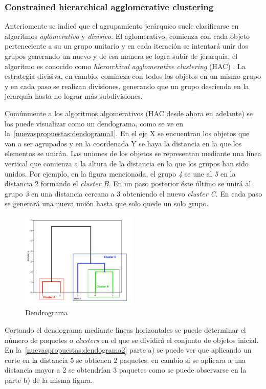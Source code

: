 \subsubsection{Constrained hierarchical agglomerative clustering}
Anteriomente se indicó que el agrupamiento jerárquico suele clasificarse en algoritmos \textit{aglomerativo} y \textit{divisivo}. El aglomerativo, comienza con cada objeto perteneciente a su un grupo unitario y en cada iteración se intentará unir dos grupos generando un nuevo y de esa manera se logra subir de jerarquía, el algoritmo es conocido como \textit{hierarchical agglomerative clustering} (HAC) \cite{journals/tkde/Amer-YahiaBCFMZ14}. La estrategia divisiva, en cambio, comineza con todos los objetos en un mismo grupo y en cada paso se realizan divisiones, generando que un grupo descienda en la jerarquía hasta no lograr más subdivisiones.

Comúnmente a los algoritmos algomerativos (HAC desde ahora en adelante) se los puede visualizar como un dendograma, como se ve en la~\autoref{nuevaspropuestas:dendograma1}. En el eje X se encuentran los objetos que van a ser agrupados y en la coordenada Y se haya la distancia en la que los elementos se unirán. Las uniones de los objetos se representan mediante una línea vertical que comienza a la altura de la distancia en la que los grupos han sido unidos. Por ejemplo, en la figura mencionada, el grupo \textit{4} se une al \textit{5} en la distancia 2 formando el \textit{cluster B}. En un paso posterior éste último se unirá al grupo \textit{3} en una distancia cercana a 3 obteniendo el nuevo \textit{cluster C}. En cada paso se generará una nueva unión hasta que solo quede un solo grupo.

\begin{figure}[H]
  \centering
    \includegraphics[width=0.5\textwidth]{img/dendograma01.png}
  \caption{Dendrograma}
  \label{nuevaspropuestas:dendograma1}
\end{figure}

Cortando el dendograma mediante líneas horizontales se puede determinar el número de paquetes o \emph{clusters} en el que se dividirá el conjunto de objetos inicial. En la~\autoref{nuevaspropuestas:dendograma2} parte a) se puede ver que aplicando un corte en la distancia 5 se obtienen 2 paquetes, en cambio si se aplicara a una distancia mayor a 2 se obtendrían 3 paquetes como se puede observarse en la parte b) de la misma figura.

